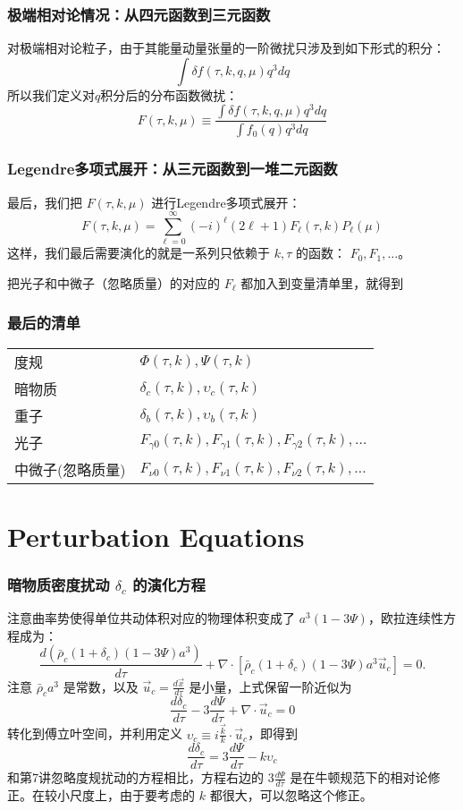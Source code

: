 \documentclass[CJK,13pt]{beamer}
\begin{document}
  \begin{frame}
    \frametitle{极端相对论情况：从四元函数到三元函数}
    对极端相对论粒子，由于其能量动量张量的一阶微扰只涉及到如下形式的积分：
    $$\int \delta f (\tau, k, q, \mu) q^3 dq $$
    所以我们定义{\blue 对$q$积分后的分布函数微扰}：
    $$ F(\tau, k, \mu) \equiv \frac{\int \delta f (\tau, k, q, \mu) q^3 dq}{\int f_0(q) q^3 dq} $$
  \end{frame}


    \begin{frame}
      \frametitle{Legendre多项式展开：从三元函数到一堆二元函数}
      最后，我们把 $F(\tau, k, \mu)$ 进行Legendre多项式展开：
      $$ F(\tau, k, \mu) = \sum_{\ell=0}^\infty (-i)^\ell (2\ell+1) F_\ell(\tau, k) P_\ell(\mu) $$
      这样，我们最后需要演化的就是一系列只依赖于 $k, \tau$ 的函数： $F_0, F_1, \ldots$。

      \skipline
      
      把光子和中微子（忽略质量）的对应的 $F_\ell$  都加入到变量清单里，就得到
    \end{frame}

    
    \begin{frame}
    \frametitle{最后的清单}
    \begin{tabular}{ll}
    度规 & $\Phi(\tau, k), \Psi(\tau, k)$ \\
    暗物质 & $\delta_c(\tau, k), \upsilon_c(\tau, k)$ \\
    重子 & $\delta_b(\tau, k), \upsilon_b(\tau, k)$ \\
    光子 & $F_{\gamma 0}(\tau, k), F_{\gamma 1}(\tau, k), F_{\gamma 2}(\tau, k), \ldots $ \\
    中微子(忽略质量) & $F_{\nu 0}(\tau, k), F_{\nu 1}(\tau, k), F_{\nu 2}(\tau, k), \ldots $
    \end{tabular}
    \end{frame}

    \section{Perturbation Equations}


    \begin{frame}
      \frametitle{暗物质密度扰动 $\delta_c$ 的演化方程}
      注意曲率势使得单位共动体积对应的物理体积变成了 $a^3(1-3\Psi)$，欧拉连续性方程成为：
      $$\frac{d\left(\bar{\rho}_c(1+\delta_c)(1-3\Psi)a^3\right)}{d\tau} + \nabla\cdot\left[\bar{\rho}_c(1+\delta_c)(1-3\Psi)a^3 \vec{u}_c\right] = 0.$$
      注意 $\bar{\rho}_c a^3$ 是常数，以及 $\vec{u}_c = \frac{d\vec{x}}{d\tau}$ 是小量，上式保留一阶近似为
      $$ \frac{d\delta_c}{d\tau} - 3\frac{d\Psi}{d\tau} + \nabla\cdot \vec{u}_c = 0 $$
      转化到傅立叶空间，并利用定义 $\upsilon_c\equiv i\frac{\vec{k}}{k}\cdot\vec{u}_c$，即得到
      {\blue      $$ \frac{d\delta_c}{d\tau} = 3\frac{d\Psi}{d\tau} - k\upsilon_c $$}
      和第7讲忽略度规扰动的方程相比，方程右边的 $3\frac{d\Psi}{d\tau}$ 是在牛顿规范下的相对论修正。在较小尺度上，由于要考虑的 $k$ 都很大，可以忽略这个修正。
    \end{frame}
    
\end{document}
